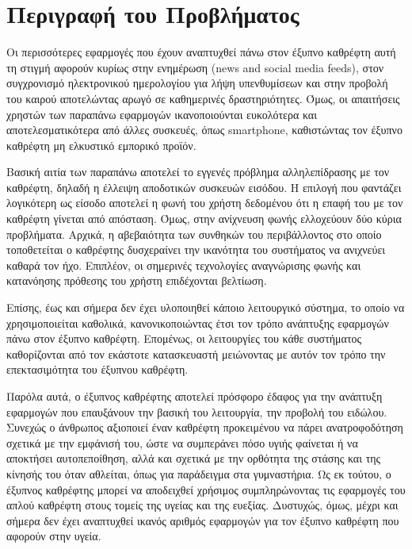 \section{Περιγραφή του Προβλήματος}
\label{section:problem_description}

Οι περισσότερες εφαρμογές που έχουν αναπτυχθεί πάνω στον έξυπνο καθρέφτη αυτή τη στιγμή αφορούν κυρίως στην ενημέρωση (news and social media feeds), στον συγχρονισμό ηλεκτρονικού ημερολογίου για λήψη υπενθυμίσεων και στην προβολή του καιρού αποτελώντας αρωγό σε καθημερινές δραστηριότητες. Όμως, οι απαιτήσεις χρηστών των παραπάνω εφαρμογών ικανοποιούνται ευκολότερα και αποτελεσματικότερα από άλλες συσκευές, όπως smartphone, καθιστώντας τον έξυπνο καθρέφτη μη ελκυστικό εμπορικό προϊόν. 

Βασική αιτία των παραπάνω αποτελεί το εγγενές πρόβλημα αλληλεπίδρασης με τον καθρέφτη, δηλαδή η έλλειψη αποδοτικών συσκευών εισόδου. Η επιλογή που φαντάζει λογικότερη ως είσοδο αποτελεί η φωνή του χρήστη δεδομένου ότι η επαφή του με τον καθρέφτη γίνεται από απόσταση. Όμως, στην ανίχνευση φωνής ελλοχεύουν δύο κύρια προβλήματα. Αρχικά, η αβεβαιότητα των συνθηκών του περιβάλλοντος στο οποίο τοποθετείται ο καθρέφτης δυσχεραίνει την ικανότητα του συστήματος να ανιχνεύει καθαρά τον ήχο. Επιπλέον, οι σημερινές τεχνολογίες αναγνώρισης φωνής και κατανόησης πρόθεσης του χρήστη επιδέχονται βελτίωση.

Επίσης, έως και σήμερα δεν έχει υλοποιηθεί κάποιο λειτουργικό σύστημα, το οποίο να χρησιμοποιείται καθολικά, κανονικοποιώντας έτσι τον τρόπο ανάπτυξης εφαρμογών πάνω στον έξυπνο καθρέφτη. Επομένως, οι λειτουργίες του κάθε συστήματος καθορίζονται από τον εκάστοτε κατασκευαστή μειώνοντας με αυτόν τον τρόπο την επεκτασιμότητα του έξυπνου καθρέφτη.

Παρόλα αυτά, ο έξυπνος καθρέφτης αποτελεί πρόσφορο έδαφος για την ανάπτυξη εφαρμογών που επαυξάνουν την βασική του λειτουργία, την προβολή του ειδώλου. Συνεχώς ο άνθρωπος αξιοποιεί έναν καθρέφτη προκειμένου να πάρει ανατροφοδότηση σχετικά με την εμφάνισή του, ώστε να συμπεράνει πόσο υγιής φαίνεται ή να αποκτήσει αυτοπεποίθηση, αλλά και σχετικά με την ορθότητα της στάσης και της κίνησής του όταν αθλείται, όπως για παράδειγμα στα γυμναστήρια. Ως εκ τούτου, ο έξυπνος καθρέφτης μπορεί να αποδειχθεί χρήσιμος συμπληρώνοντας τις εφαρμογές του απλού καθρέφτη στους τομείς της υγείας και της ευεξίας. Δυστυχώς, όμως, μέχρι και σήμερα δεν έχει αναπτυχθεί ικανός αριθμός εφαρμογών για τον έξυπνο καθρέφτη που αφορούν στην υγεία.


 